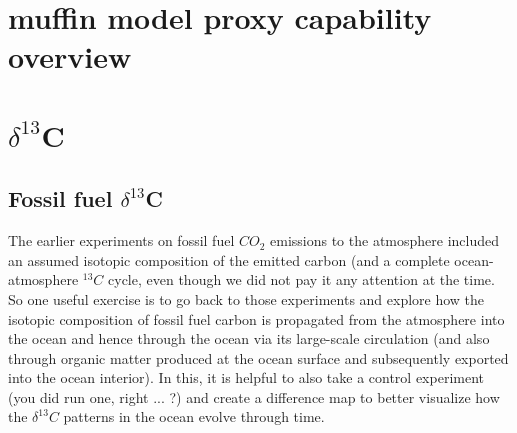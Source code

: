 \documentclass[11pt,fleqn]{book} %
\begin{document}

\newpage


\section{muffin model proxy capability overview}






\newpage


\section{$\delta^{13}$C}


\subsection{Fossil fuel $\delta^{13}$C}

The earlier experiments on fossil fuel \(CO_{2}\) emissions to the atmosphere included an assumed isotopic composition of the emitted carbon (and a complete ocean-atmosphere \(^{13}C\) cycle, even though we did not pay it any attention at the time. So one useful exercise is to go back to those experiments and explore how the  isotopic composition of fossil fuel carbon is propagated from the atmosphere into the ocean and hence through the ocean via its large-scale circulation (and also through organic matter produced at the ocean surface and subsequently exported into the ocean interior). In this, it is helpful to also take a control experiment (you did run one, right ... ?) and create a difference map to better visualize how the \(\delta^{13}C\) patterns in the ocean evolve through time.
\end{document}
